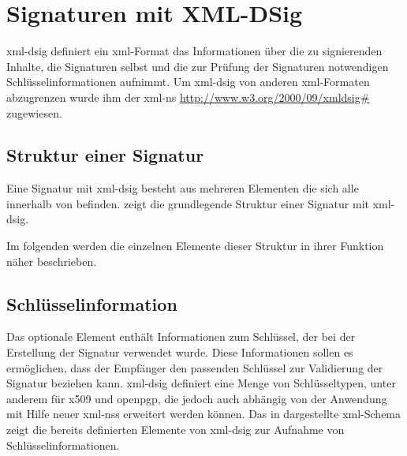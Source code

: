 
\chapter{Signaturen mit XML-DSig}
\label{chap:XML-DSig}
\gls{xml-dsig} definiert ein \gls{xml}-Format das Informationen über die zu signierenden Inhalte, die Signaturen selbst und die zur Prüfung der Signaturen
notwendigen Schlüsselinformationen aufnimmt. Um \gls{xml-dsig} von anderen \gls{xml}-Formaten abzugrenzen wurde ihm der \gls{xml-ns}
\url{http://www.w3.org/2000/09/xmldsig#} zugewiesen.

\section{Struktur einer Signatur}
Eine Signatur mit \gls{xml-dsig} besteht aus mehreren Elementen die sich alle innerhalb von  befinden.  zeigt
die grundlegende Struktur einer Signatur mit \gls{xml-dsig}.



Im folgenden werden die einzelnen Elemente dieser Struktur in ihrer Funktion näher beschrieben. 

\section{Schlüsselinformation}
Das optionale Element  enthält Informationen zum Schlüssel, der bei der Erstellung der Signatur verwendet wurde. Diese Informationen sollen es
ermöglichen, dass der Empfänger den passenden Schlüssel zur Validierung der Signatur beziehen kann. \gls{xml-dsig} definiert eine Menge von
Schlüsseltypen, unter anderem für \gls{x509} und \gls{openpgp}, die jedoch auch abhängig von der Anwendung mit Hilfe neuer \glspl{xml-ns} erweitert werden
können. Das in  dargestellte \gls{xml}-Schema zeigt die bereits definierten Elemente von \gls{xml-dsig} zur Aufnahme von
Schlüsselinformationen.



